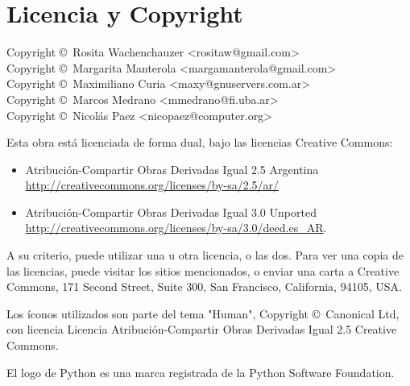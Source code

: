 
\chapter[Licencia y Copyright]{Licencia y Copyright}

{\noindent
Copyright \copyright\ Rosita Wachenchauzer <rositaw@gmail.com> \\
Copyright \copyright\ Margarita Manterola <margamanterola@gmail.com> \\
Copyright \copyright\ Maximiliano Curia <maxy@gnuservers.com.ar> \\
Copyright \copyright\ Marcos Medrano  <mmedrano@fi.uba.ar> \\
Copyright \copyright\ Nicolás Paez <nicopaez@computer.org> \\
}

Esta obra está licenciada de forma dual, bajo las licencias Creative
Commons:

\begin{itemize}
 \item Atribución-Compartir Obras Derivadas Igual 2.5 Argentina \\
       \url{http://creativecommons.org/licenses/by-sa/2.5/ar/}
 \item Atribución-Compartir Obras Derivadas Igual 3.0 Unported \\
       \url{http://creativecommons.org/licenses/by-sa/3.0/deed.es\_AR}.
\end{itemize}
 
A su criterio, puede utilizar una u otra licencia, o las dos.
Para ver una copia de las licencias, puede visitar los sitios
mencionados, o enviar una carta a Creative Commons,
171 Second Street, Suite 300, San Francisco, California, 94105, USA.

Los íconos utilizados son parte del tema "Human", Copyright \copyright\ Canonical
Ltd, con licencia Licencia Atribución-Compartir Obras Derivadas Igual 2.5
Creative Commons.

El logo de Python es una marca registrada de la Python Software Foundation.

